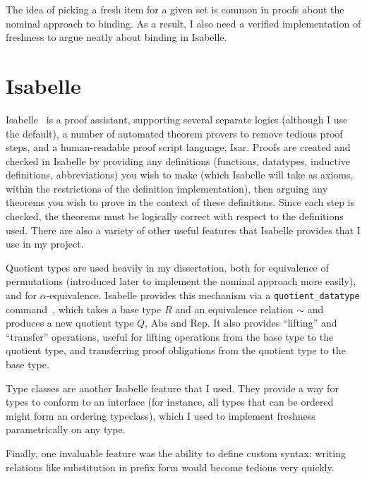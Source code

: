 The idea of picking a fresh item for a given set is common in proofs about the nominal approach to binding.
As a result, I also need a verified implementation of freshness to argue neatly about binding in Isabelle.

\section{Isabelle}
Isabelle~\cite{isabelle} is a proof assistant, supporting several separate logics (although I use the default), a number of automated theorem provers to remove tedious proof steps, and a human-readable proof script language, Isar.
Proofs are created and checked in Isabelle by providing any definitions (functions, datatypes, inductive definitions, abbreviations) you wish to make (which Isabelle will take as axioms, within the restrictions of the definition implementation), then arguing any theorems you wish to prove in the context of these definitions.
Since each step is checked, the theorems must be logically correct with respect to the definitions used.
There are also a variety of other useful features that Isabelle provides that I use in my project.

Quotient types are used heavily in my dissertation, both for equivalence of permutations (introduced later to implement the nominal approach more easily), and for \(\alpha\)-equivalence.
Isabelle provides this mechanism via a \texttt{quotient\_datatype} command~\cite{isabelle-quotient}, which takes a base type \(R\) and an equivalence relation \(\sim\) and produces a new quotient type \(Q\), \(\mathrm{Abs}\) and \(\mathrm{Rep}\).
It also provides ``lifting'' and ``transfer'' operations, useful for lifting operations from the base type to the quotient type, and transferring proof obligations from the quotient type to the base type.

Type classes are another Isabelle feature that I used.
They provide a way for types to conform to an interface (for instance, all types that can be ordered might form an ordering typeclass), which I used to implement freshness parametrically on any type.

Finally, one invaluable feature was the ability to define custom syntax: writing relations like substitution in prefix form would become tedious very quickly.

